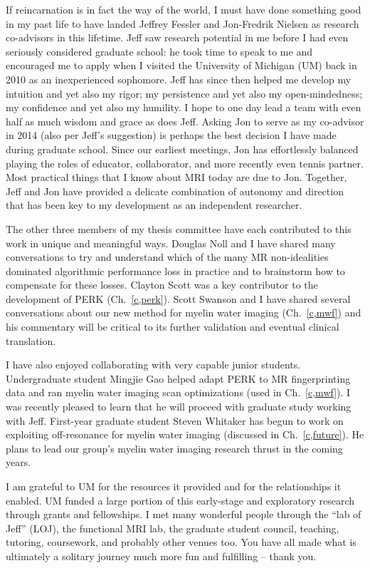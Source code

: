 \setlength{\parindent}{0ex}%
If reincarnation is in fact the way of the world,
I must have done something good 
in my past life
to have landed Jeffrey Fessler and Jon-Fredrik Nielsen
as research co-advisors 
in this lifetime.
Jeff saw research potential in me
before I had even seriously considered graduate school:
he took time to speak to me
and encouraged me to apply
when I visited the University of Michigan (UM)
back in 2010 as an inexperienced sophomore.
Jeff has since then helped me develop
my intuition and yet also my rigor;
my persistence and yet also my open-mindedness;
my confidence and yet also my humility.
I hope to one day lead a team 
with even half as much wisdom and grace
as does Jeff.
Asking Jon to serve as my co-advisor in 2014
(also per Jeff's suggestion)
is perhaps the best decision
I have made during graduate school.
Since our earliest meetings,
Jon has effortlessly balanced playing the roles
of educator, collaborator, 
and more recently even tennis partner.
Most practical things 
that I know about MRI today 
are due to Jon.
Together,
Jeff and Jon have provided
a delicate combination
of autonomy and direction
that has been key 
to my development 
as an independent researcher.

\setlength{\parindent}{4ex}%
The other three members 
of my thesis committee
have each contributed to this work
in unique and meaningful ways.
Douglas Noll and I have shared many conversations
to try and understand 
which of the many MR non-idealities
dominated algorithmic performance loss in practice
and 
to brainstorm how to compensate for these losses.
Clayton Scott was a key contributor
to the development of PERK (Ch.~\ref{c,perk}).
Scott Swanson and I have shared several conversations
about our new method for myelin water imaging (Ch.~\ref{c,mwf})
and his commentary will be critical 
to its further validation
and eventual clinical translation.

I have also enjoyed collaborating 
with very capable junior students.
Undergraduate student Mingjie Gao 
helped adapt PERK to MR fingerprinting data
\cite{nataraj:17:slw}
and ran myelin water imaging scan optimizations 
(used in Ch.~\ref{c,mwf}).
I was recently pleased to learn
that he will proceed with graduate study
working with Jeff.
First-year graduate student Steven Whitaker
has begun to work
on exploiting off-resonance for myelin water imaging
(discussed in Ch.~\ref{c,future}).
He plans to lead our group's 
myelin water imaging research thrust
in the coming years.

I am grateful to UM
for the resources it provided
and for the relationships it enabled.
UM funded a large portion
of this early-stage and exploratory research
through grants and fellowships.
I met many wonderful people 
through the ``lab of Jeff'' (LOJ),
the functional MRI lab,
the graduate student council, 
teaching,
tutoring,
coursework,
and probably other venues too.
You have all made 
what is ultimately a solitary journey
much more fun and fulfilling -- thank you.

